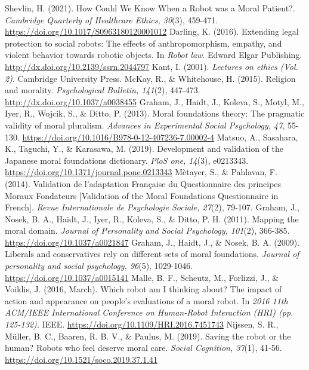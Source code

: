 \documentclass[a4j,12pt]{jreport}
\begin{document}
\begin{thebibliography}{999}
  Shevlin, H. (2021). How Could We Know When a Robot was a Moral Patient?. \textsl{Cambridge Quarterly of Healthcare Ethics, 30}(3), 459-471. \url{https://doi.org/10.1017/S0963180120001012}
 Darling, K. (2016). Extending legal protection to social robots: The effects of anthropomorphism, empathy, and violent behavior towards robotic objects. In \textsl{Robot law}. Edward Elgar Publishing. \url{http://dx.doi.org/10.2139/ssrn.2044797}
 Kant, I. (2001). \textsl{Lectures on ethics (Vol. 2)}. Cambridge University Press.
 McKay, R., \& Whitehouse, H. (2015). Religion and morality. \textsl{Psychological Bulletin, 141}(2), 447-473. \url{http://dx.doi.org/10.1037/a0038455}
 Graham, J., Haidt, J., Koleva, S., Motyl, M., Iyer, R., Wojcik, S., \& Ditto, P. (2013). Moral foundations theory: The pragmatic validity of moral pluralism. \textsl{Advances in Experimental Social Psychology, 47}, 55-130. \url{https://doi.org/10.1016/B978-0-12-407236-7.00002-4}
 Matsuo, A., Sasahara, K., Taguchi, Y., \& Karasawa, M. (2019). Development and validation of the Japanese moral foundations dictionary. \textsl{PloS one, 14}(3), e0213343. \url{https://doi.org/10.1371/journal.pone.0213343}
 M\`{e}tayer, S., \& Pahlavan, F. (2014). Validation de l’adaptation Fran\c{c}aise du Questionnaire des principes Moraux Fondateurs [Validation of the Moral Foundations Questionnaire in French]. \textsl{Revue Internationale de Psychologie Sociale, 27}(2), 79-107.
 Graham, J., Nosek, B. A., Haidt, J., Iyer, R., Koleva, S., \& Ditto, P. H. (2011). Mapping the moral domain. \textsl{Journal of Personality and Social Psychology, 101}(2), 366-385. \url{https://doi.org/10.1037/a0021847}
 Graham, J., Haidt, J., \& Nosek, B. A. (2009). Liberals and conservatives rely on different sets of moral foundations. \textsl{Journal of personality and social psychology, 96}(5), 1029-1046. \url{https://doi.org/10.1037/a0015141}
 Malle, B. F., Scheutz, M., Forlizzi, J., \& Voiklis, J. (2016, March). Which robot am I thinking about? The impact of action and appearance on people's evaluations of a moral robot. In \textsl{2016 11th ACM/IEEE International Conference on Human-Robot Interaction (HRI) (pp. 125-132).} IEEE. \url{https://doi.org/10.1109/HRI.2016.7451743}
 Nijssen, S. R., M\"{u}ller, B. C., Baaren, R. B. V., \& Paulus, M. (2019). Saving the robot or the human? Robots who feel deserve moral care. \textsl{Social Cognition, 37}(1), 41-56. \url{https://doi.org/10.1521/soco.2019.37.1.41}

\end{thebibliography}
\end{document}
